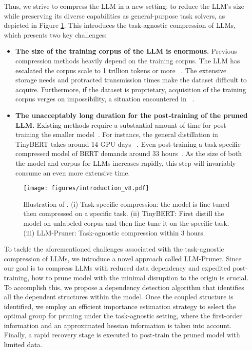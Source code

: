 Thus, we strive to compress the LLM in a new setting: to reduce the LLM's size while preserving its diverse capabilities as general-purpose task solvers, as depicted in Figure \ref{fig:intro}. This introduces the task-agnostic compression of LLMs, which presents two key challenges:
\begin{itemize}[leftmargin=*,topsep=5pt]
    \setlength{\itemsep}{1pt}
    \setlength{\parskip}{0pt}
    \setlength{\parsep}{0pt}
    \item \textbf{The size of the training corpus of the LLM is enormous.} Previous compression methods heavily depend on the training corpus. The LLM has escalated the corpus scale to 1 trillion tokens or more ~\cite{hoffmann2022training, touvron2023llama}. The extensive storage needs and protracted transmission times make the dataset difficult to acquire. Furthermore, if the dataset is proprietary, acquisition of the training corpus verges on impossibility, a situation encountered in ~\cite{zeng2022glm,openai2023gpt4}.
    \item \textbf{The unacceptably long duration for the post-training of the pruned LLM.} Existing methods require a substantial amount of time for post-training the smaller model~\cite{wang2020minilm,liang2023homodistil}. For instance, the general distillation in TinyBERT takes around 14 GPU days ~\cite{jiao2020tinybert}. Even post-training a task-specific compressed model of BERT demands around 33 hours~\cite{xia2022structured,kwon2022fast}. As the size of both the model and corpus for LLMs increases rapidly, this step will invariably consume an even more extensive time.
\end{itemize}

\begin{figure}[t!]
    \centering
    \texttt{[image: figures/introduction\_v8.pdf]}
    \caption{
        Illustration of \methodname. 
        (i) Task-specific compression: the model is fine-tuned then compressed on a specific task. (ii) TinyBERT: First distill the model on unlabeled corpus and then fine-tune it on the specific task. (iii) LLM-Pruner: Task-agnostic compression  within 3 hours. %
    }
    \label{fig:intro}
    \vspace{-5mm}
\end{figure}

To tackle the aforementioned challenges associated with the task-agnostic compression of LLMs, we introduce a novel approach called LLM-Pruner. Since our goal is to compress LLMs with reduced data dependency and expedited post-training, how to prune model with the minimal disruption to the origin is crucial. To accomplish this, we propose a dependency detection algorithm that identifies all the dependent structures within the model. Once the coupled structure is identified, we employ an efficient importance estimation strategy to select the optimal group for pruning under the task-agnostic setting, where the first-order information and an approximated hessian information is taken into account. Finally, a rapid recovery stage is executed to post-train the pruned model with limited data. 

